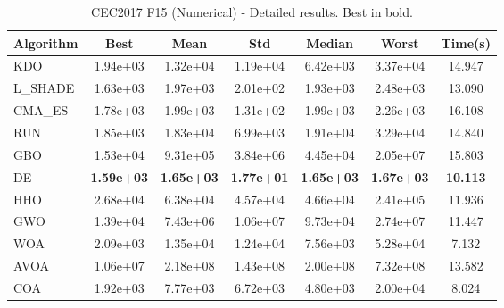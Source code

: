 \begin{table}[H]
\centering\small
\caption{CEC2017 F15 (Numerical) - Detailed results. Best in bold.}
\label{tab:cec2017_F15}
\begin{tabular}{lcccccc}
\toprule
\textbf{Algorithm} & \textbf{Best} & \textbf{Mean} & \textbf{Std} & \textbf{Median} & \textbf{Worst} & \textbf{Time(s)} \\
\midrule
KDO & 1.94e+03 & 1.32e+04 & 1.19e+04 & 6.42e+03 & 3.37e+04 & 14.947 \\
L_SHADE & 1.63e+03 & 1.97e+03 & 2.01e+02 & 1.93e+03 & 2.48e+03 & 13.090 \\
CMA_ES & 1.78e+03 & 1.99e+03 & 1.31e+02 & 1.99e+03 & 2.26e+03 & 16.108 \\
RUN & 1.85e+03 & 1.83e+04 & 6.99e+03 & 1.91e+04 & 3.29e+04 & 14.840 \\
GBO & 1.53e+04 & 9.31e+05 & 3.84e+06 & 4.45e+04 & 2.05e+07 & 15.803 \\
DE & \textbf{1.59e+03} & \textbf{1.65e+03} & \textbf{1.77e+01} & \textbf{1.65e+03} & \textbf{1.67e+03} & \textbf{10.113} \\
HHO & 2.68e+04 & 6.38e+04 & 4.57e+04 & 4.66e+04 & 2.41e+05 & 11.936 \\
GWO & 1.39e+04 & 7.43e+06 & 1.06e+07 & 9.73e+04 & 2.74e+07 & 11.447 \\
WOA & 2.09e+03 & 1.35e+04 & 1.24e+04 & 7.56e+03 & 5.28e+04 & 7.132 \\
AVOA & 1.06e+07 & 2.18e+08 & 1.43e+08 & 2.00e+08 & 7.32e+08 & 13.582 \\
COA & 1.92e+03 & 7.77e+03 & 6.72e+03 & 4.80e+03 & 2.00e+04 & 8.024 \\
\bottomrule
\end{tabular}
\end{table}
